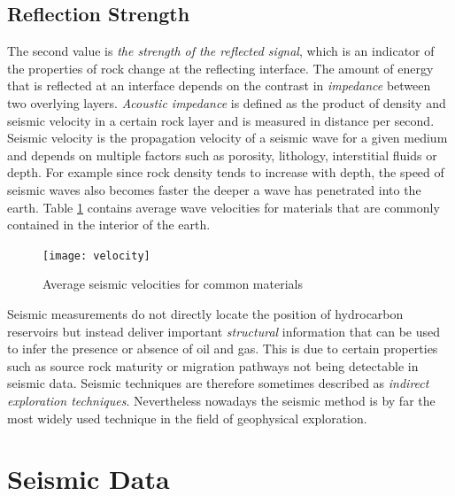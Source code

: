 \documentclass[twocolumn]{article}
\begin{document}
\subsection*{Reflection Strength}
The second value is \textit{the strength of the reflected signal}, which is an indicator of the properties of rock change at the reflecting interface. 
The amount of energy that is reflected at an interface depends on the contrast in \textit{impedance} between two overlying layers. 
\textit{Acoustic impedance} is defined as the product of density and seismic velocity in a certain rock layer and is measured in distance per second. Seismic velocity is the propagation velocity of a seismic wave for a given medium and depends on multiple factors such as porosity, lithology, interstitial fluids or depth. For example since rock density tends to increase with depth, the speed of seismic waves also becomes faster the deeper a wave has penetrated into the earth. Table \ref{velocity} contains average wave velocities for materials that are commonly contained in the interior of the earth.
\begin{figure}[htb]
        \centering
        \texttt{[image: velocity]}
        \caption{Average seismic velocities for common materials}
        \label{velocity}
\end{figure}

Seismic measurements do not directly locate the position of hydrocarbon reservoirs but instead deliver important \textit{structural} information that can be used to infer the presence or absence of oil and gas. This is due to certain properties such as source rock maturity or migration pathways not being detectable in seismic data. Seismic techniques are therefore sometimes described as \textit{indirect exploration techniques}. 
Nevertheless nowadays the seismic method is by far the most widely used technique in the field of geophysical exploration.

\section{Seismic Data}
\end{document}

